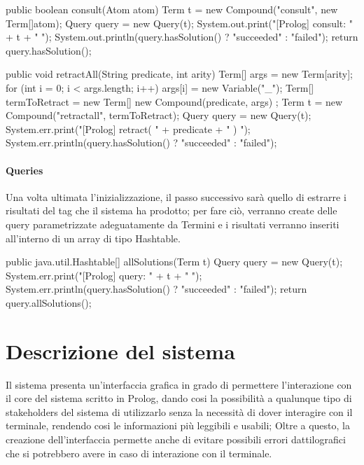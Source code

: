 \begin{javacode}
	public boolean consult(Atom atom) {
		Term t = new Compound("consult", new Term[]{atom});
		Query query = new Query(t);
		System.out.print("[Prolog] consult: " + t + " ");
		System.out.println(query.hasSolution() ? "succeeded" : "failed");
		return query.hasSolution();
	}
\end{javacode}

\begin{javacode} 
	public void retractAll(String predicate, int arity) {  
		Term[] args = new Term[arity];
		for (int i = 0; i < args.length; i++)
		args[i] = new Variable("_");
		Term[] termToRetract = new Term[]{ new Compound(predicate, args) };    
		Term t = new Compound("retractall", termToRetract);
		Query query = new Query(t);
		System.err.print("[Prolog] retract( " + predicate + " ) ");
		System.err.println(query.hasSolution() ? "succeeded" : "failed");
	}
\end{javacode}

\paragraph{Queries}
Una volta ultimata l'inizializzazione, il passo successivo sarà quello di estrarre i risultati del tag che il sistema ha prodotto; per fare ciò, verranno create delle query parametrizzate adeguatamente da Termini e i risultati verranno inseriti all'interno di un array di tipo Hashtable.

\begin{javacode}
	public java.util.Hashtable[] allSolutions(Term t) {
		Query query = new Query(t);
		System.err.print("[Prolog] query: " + t + " ");
		System.err.println(query.hasSolution() ? "succeeded" : "failed");
		return query.allSolutions();
	}
\end{javacode}

\section{Descrizione del sistema}
Il sistema presenta un'interfaccia grafica in grado di permettere l'interazione con il core del sistema scritto in Prolog, dando cosi la possibilità a qualunque tipo di stakeholders del sistema di utilizzarlo senza la necessità di dover interagire con il terminale, rendendo cosi le informazioni più leggibili e usabili; Oltre a questo, la creazione dell'interfaccia permette anche di evitare possibili errori dattilografici che si potrebbero avere in caso di interazione con il terminale.

